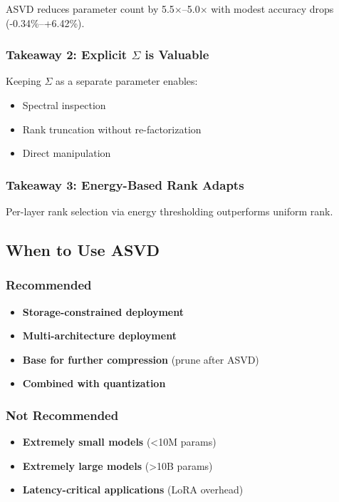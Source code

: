 ASVD reduces parameter count by 5.5$\times$--5.0$\times$ with modest 
accuracy drops (-0.34\%--+6.42\%).

\subsubsection{Takeaway 2: Explicit $\Sigma$ is Valuable}

Keeping $\Sigma$ as a separate parameter enables:
\begin{itemize}
\item Spectral inspection
\item Rank truncation without re-factorization
\item Direct manipulation

\end{itemize}
\subsubsection{Takeaway 3: Energy-Based Rank Adapts}

Per-layer rank selection via energy thresholding outperforms uniform rank.

\subsection{When to Use ASVD}

\subsubsection{Recommended}

\begin{itemize}
\item \textbf{Storage-constrained deployment}
\item \textbf{Multi-architecture deployment}
\item \textbf{Base for further compression} (prune after ASVD)
\item \textbf{Combined with quantization}

\end{itemize}
\subsubsection{Not Recommended}

\begin{itemize}
\item \textbf{Extremely small models} (\textless{}10M params)
\item \textbf{Extremely large models} (\textgreater{}10B params)
\item \textbf{Latency-critical applications} (LoRA overhead)

\end{itemize}

